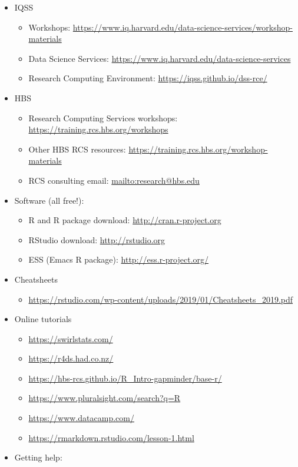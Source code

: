 \documentclass[
]{book}
\providecommand{\tightlist}{%
  \setlength{\itemsep}{0pt}\setlength{\parskip}{0pt}}
\begin{document}
\begin{itemize}
\tightlist
\item
  IQSS

  \begin{itemize}
  \tightlist
  \item
    Workshops: \url{https://www.iq.harvard.edu/data-science-services/workshop-materials}
  \item
    Data Science Services: \url{https://www.iq.harvard.edu/data-science-services}
  \item
    Research Computing Environment: \url{https://iqss.github.io/dss-rce/}
  \end{itemize}
\item
  HBS

  \begin{itemize}
  \tightlist
  \item
    Research Computing Services workshops: \url{https://training.rcs.hbs.org/workshops}
  \item
    Other HBS RCS resources: \url{https://training.rcs.hbs.org/workshop-materials}
  \item
    RCS consulting email: \url{mailto:research@hbs.edu}
  \end{itemize}
\item
  Software (all free!):

  \begin{itemize}
  \tightlist
  \item
    R and R package download: \url{http://cran.r-project.org}
  \item
    RStudio download: \url{http://rstudio.org}
  \item
    ESS (Emacs R package): \url{http://ess.r-project.org/}
  \end{itemize}
\item
  Cheatsheets

  \begin{itemize}
  \tightlist
  \item
    \url{https://rstudio.com/wp-content/uploads/2019/01/Cheatsheets_2019.pdf}
  \end{itemize}
\item
  Online tutorials

  \begin{itemize}
  \tightlist
  \item
    \url{https://swirlstats.com/}
  \item
    \url{https://r4ds.had.co.nz/}
  \item
    \url{https://hbs-rcs.github.io/R_Intro-gapminder/base-r/}
  \item
    \url{https://www.pluralsight.com/search?q=R}
  \item
    \url{https://www.datacamp.com/}
  \item
    \url{https://rmarkdown.rstudio.com/lesson-1.html}
  \end{itemize}
\item
  Getting help:


\end{itemize}
\end{document}
